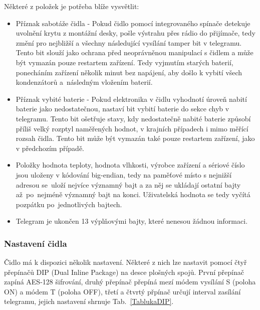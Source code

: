 \newpage{}

Některé z položek je potřeba blíže vysvětlit:

\begin{itemize}
	\item Příznak sabotáže čidla - Pokud čidlo pomocí integrovaného spínače detekuje uvolnění krytu z montážní desky, pošle výstrahu přes rádio do přijímače, tedy změní pro nejbližší a všechny následující vysílání tamper bit v telegramu. Tento bit slouží jako ochrana před neoprávněnou manipulací s čidlem a může být vymazán pouze restartem zařízení. Tedy vyjmutím starých baterií, ponecháním zařízení několik minut bez napájení, aby došlo k vybití všech kondenzátorů a~následným vložením baterií.
\item Příznak vybité baterie - Pokud elektronika v čidlu vyhodnotí úroveň nabití baterie jako nedostatečnou, nastaví bit vybití baterie do sekce chyb v telegramu. Tento bit ošetřuje stavy, kdy nedostatečně nabité baterie způsobí příliš velký rozptyl naměřených hodnot, v krajních případech i mimo měřící rozsah čidla. Tento bit může být vymazán také pouze restartem zařízení, jako v předchozím případě.
\item Položky hodnota teploty, hodnota vlhkosti, výrobce zařízení a sériové číslo jsou uloženy v kódování big-endian, tedy na paměťové místo s nejnižší adresou se~uloží nejvíce významný bajt a za něj se ukládají ostatní bajty až~po~nejméně významný bajt na konci. Uživatelská hodnota se tedy vyčítá pozpátku po~jednotlivých bajtech.
\item Telegram je ukončen 13 výplňovými bajty, které nenesou žádnou informaci.
\end{itemize}


\subsubsection{Nastavení čidla}
Čidlo má k dispozici několik nastavení. Některé z nich lze nastavit pomocí čtyř přepínačů DIP (Dual Inline Package) na desce plošných spojů.
První přepínač zapíná AES-128 šifrování, druhý přepínač přepíná mezí módem vysílání S (poloha ON) a módem T (poloha OFF), třetí a čtvrtý přpínač určují interval zasílání telegramu, jejich nastavení shrnuje Tab.~\ref{TablukaDIP}.

